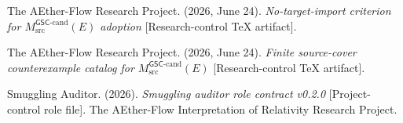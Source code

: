 \documentclass[11pt]{article}
\begin{document}
The AEther-Flow Research Project. (2026, June 24). \textit{No-target-import
criterion for \(M_{\mathrm{src}}^{\mathsf{GSC}\mbox{-}\mathrm{cand}}(E)\)
adoption} [Research-control TeX artifact].

The AEther-Flow Research Project. (2026, June 24). \textit{Finite source-cover
counterexample catalog for
\(M_{\mathrm{src}}^{\mathsf{GSC}\mbox{-}\mathrm{cand}}(E)\)}
[Research-control TeX artifact].

Smuggling Auditor. (2026). \textit{Smuggling auditor role contract v0.2.0}
[Project-control role file]. The AEther-Flow Interpretation of Relativity
Research Project.
\end{document}
